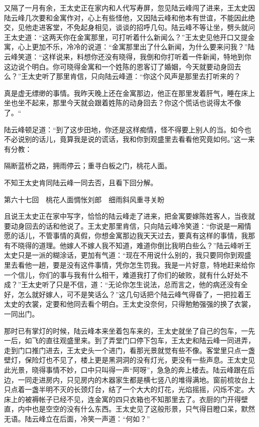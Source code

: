 \documentclass[12pt,UTF8]{ctexbook}
\begin{document}
{{{又隔了一月有余，王太史正在家内和人代写寿屏，忽见陆云峰闯了进来，王太史因陆云峰几次要和金寓作对，心上有些怪他，又因陆云峰和他本有世谊，不能因此绝交，见他走进客堂，不免起身相见，谈谈的招呼几句。陆云峰不等让坐，劈头就问王太史道：“这两天你在金寓那里，可打听着什么新闻么？”王太史见他开口又提金寓，心上更加不乐，冷冷的说道：“金寓那里出了什么新闻，为什么要来问我？”陆云峰笑道：“这样说来，料想你还没有晓得，我倒和你打听着一件新闻，特地到你这边说个明白。你可晓得金寓和一个姓陈的恩客订了婚姻，今天就要动身回去么？”王太史听了那里肯信，只向陆云峰道：“你这个风声是那里去打听来的？

真是虚无缥缈的事情。我昨天晚上还在金寓那边，他正在那里发着肝气，睡在床上坐也坐不起来，那里今天就会跟着姓陈的动身回去？你这个慌话也说得太不像了。“

陆云峰顿足道：“到了这步田地，你还是这样痴情，怪不得要上别人的当。如今也不必说别的话儿，竟算我是说的谎话，我和你到观盛里去看看他究竟如何。”这一来有分教：

隔断蓝桥之路，拥雨停云；重寻白板之门，桃花人面。

不知王太史肯同陆云峰一同去否，且看下回分解。





第六十七回　桃花人面惆怅刘郎　细雨斜风重寻关盼





且说王太史正在家中写字，恰恰的陆云峰走了进来，把金寓要嫁陈姓客人，当夜就要动身回去的话和他说了。王太史那里肯信，只向陆云峰冷笑道：“你说是一厢情愿的话儿，不管事情的真假，你想金寓那边我天天过去，要真有这样的事情，我那有不晓得的道理。他嫁人不嫁人我不知道，难道你倒比我明白些么？”陆云峰听王太史只是一派的糊涂话，更加有气道：“现在不用说什么别的，我只要同你到观盛里去看他一趟，要是没有这件事情，凭你怎生罚我。我是一片好意，特地赶来给你一个信儿，你们的事与我有什么相干，难道我打了你们的破败，就有什么好处不成？”王太史听了只是不信，道：“无论你怎生说法，总而言之，他的病还没有全好，怎么就好嫁人，可不是笑话么？”这几句话把个陆云峰气得昏了，一把拉着王太史的衣裳，定要和他同去看个明白。王太史没奈何，只得勉勉强强的换了衣裳，一同出门。

那时已有掌灯的时候，陆云峰本来坐着包车来的，王太史就坐了自己的包车，一先一后，如飞的直往观盛里来。到了弄堂门口停下包车，王太史和陆云峰一同进弄，走到门口推门进去，王太史头一个进门，看那光景就觉有些不像。客堂里只点一盏壁灯，保险灯也不见了，楼上更是黑洞洞的没有灯光，更没有一些声息。王太史见此光景，晓得事情不妙，口中只叫得一声“阿呀”，急急的奔上楼去。陆云峰跟在后边，一同走进房内，只见房内的木器家生都是横七竖八的堆得满地。窗前梳妆台上只点着一盏半明不灭的长颈灯台，结了一个大大的灯花，光焰摇摇，闪烁不定。大床上的被褥帐子已经不见，连金寓的四只衣箱也不知那里去了。衣厨的门开得壁直，内中也是空空的没有什么东西。王太史见了这般形景，只气得目瞪口呆，默然无语。陆云峰立在后面，冷笑一声道：“何如？”

}}}
\end{document}
